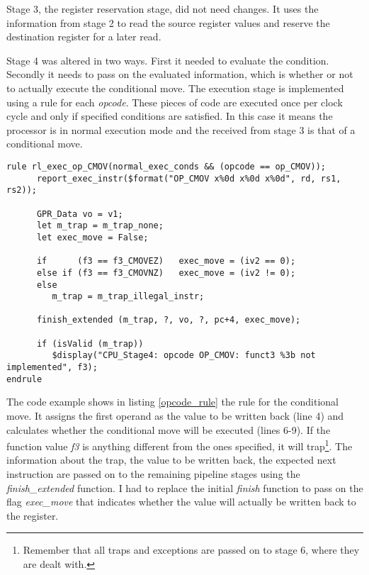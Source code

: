 \documentclass[12pt,twoside,notitlepage]{report}
\begin{document}
Stage 3, the register reservation stage, did not need changes. It uses the information from stage 2 to read the source register values and reserve the destination register for a later read.

Stage 4 was altered in two ways. First it needed to evaluate the condition. Secondly it needs to pass on the evaluated information, which is whether or not to actually execute the conditional move. The execution stage is implemented using a rule for each \textit{opcode}. These pieces of code are executed once per clock cycle and only if specified conditions are satisfied. In this case it means the processor is in normal execution mode and the  received from stage 3 is that of a conditional move.
\begin{lstlisting}[caption={bluespec rule for executing the conditional move; extract from CPU\_Stage4.bsv}, label={opcode_rule}]
rule rl_exec_op_CMOV(normal_exec_conds && (opcode == op_CMOV));
      report_exec_instr($format("OP_CMOV x%0d x%0d x%0d", rd, rs1, rs2));
      
      GPR_Data vo = v1;
      let m_trap = m_trap_none;
      let exec_move = False;
      
      if      (f3 == f3_CMOVEZ)   exec_move = (iv2 == 0);
      else if (f3 == f3_CMOVNZ)   exec_move = (iv2 != 0);
      else
         m_trap = m_trap_illegal_instr;
      
      finish_extended (m_trap, ?, vo, ?, pc+4, exec_move);

      if (isValid (m_trap))
         $display("CPU_Stage4: opcode OP_CMOV: funct3 %3b not implemented", f3);      
endrule
\end{lstlisting}

The code example shows in listing \ref{opcode_rule} the rule for the conditional move. It assigns the first operand as the value to be written back (line 4) and calculates whether the conditional move will be executed (lines 6-9). If the function value \textit{f3} is anything different from the ones specified, it will trap\footnote{Remember that all traps and exceptions are passed on to stage 6, where they are dealt with.}. The information about the trap, the value to be written back, the expected next instruction are passed on to the remaining pipeline stages using the \textit{finish\_extended} function. I had to replace the initial \textit{finish} function to pass on the flag \textit{exec\_move} that indicates whether the value will actually be written back to the register.
\end{document}
